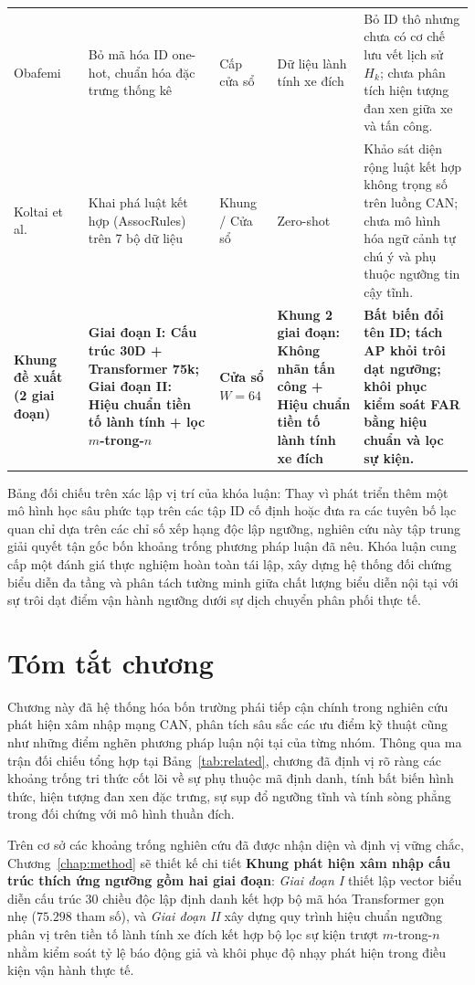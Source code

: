 \documentclass[12pt, a4paper, reqno, oneside]{book}
\begin{document}
\begin{longtable}{P{2.5cm}P{2.9cm}P{1.8cm}P{2.2cm}P{5.1cm}}
Obafemi~\cite{obafemi2026travel} & Bỏ mã hóa ID one-hot, chuẩn hóa đặc trưng thống kê & Cấp cửa sổ & Dữ liệu lành tính xe đích & Bỏ ID thô nhưng chưa có cơ chế lưu vết lịch sử $H_k$; chưa phân tích hiện tượng đan xen giữa xe và tấn công.\\
Koltai et al.~\cite{koltai2026trust} & Khai phá luật kết hợp (AssocRules) trên 7 bộ dữ liệu & Khung / Cửa sổ & Zero-shot & Khảo sát diện rộng luật kết hợp không trọng số trên luồng CAN; chưa mô hình hóa ngữ cảnh tự chú ý và phụ thuộc ngưỡng tin cậy tĩnh.\\
\textbf{Khung đề xuất (2 giai đoạn)} & \textbf{Giai đoạn I: Cấu trúc 30D + Transformer 75k; Giai đoạn II: Hiệu chuẩn tiền tố lành tính + lọc $m$-trong-$n$} & \textbf{Cửa sổ $W=64$} & \textbf{Khung 2 giai đoạn: Không nhãn tấn công + Hiệu chuẩn tiền tố lành tính xe đích} & \textbf{Bất biến đổi tên ID; tách AP khỏi trôi dạt ngưỡng; khôi phục kiểm soát FAR bằng hiệu chuẩn và lọc sự kiện.}\\\bottomrule
\end{longtable}

Bảng đối chiếu trên xác lập vị trí của khóa luận: Thay vì phát triển thêm một mô hình học sâu phức tạp trên các tập ID cố định hoặc đưa ra các tuyên bố lạc quan chỉ dựa trên các chỉ số xếp hạng độc lập ngưỡng, nghiên cứu này tập trung giải quyết tận gốc bốn khoảng trống phương pháp luận đã nêu. Khóa luận cung cấp một đánh giá thực nghiệm hoàn toàn tái lập, xây dựng hệ thống đối chứng biểu diễn đa tầng và phân tách tường minh giữa chất lượng biểu diễn nội tại với sự trôi dạt điểm vận hành ngưỡng dưới sự dịch chuyển phân phối thực tế.

\section{Tóm tắt chương}
Chương này đã hệ thống hóa bốn trường phái tiếp cận chính trong nghiên cứu phát hiện xâm nhập mạng CAN, phân tích sâu sắc các ưu điểm kỹ thuật cũng như những điểm nghẽn phương pháp luận nội tại của từng nhóm. Thông qua ma trận đối chiếu tổng hợp tại Bảng~\ref{tab:related}, chương đã định vị rõ ràng các khoảng trống tri thức cốt lõi về sự phụ thuộc mã định danh, tính bất biến hình thức, hiện tượng đan xen đặc trưng, sự sụp đổ ngưỡng tĩnh và tính sòng phẳng trong đối chứng với mô hình thuần đích. 

Trên cơ sở các khoảng trống nghiên cứu đã được nhận diện và định vị vững chắc, Chương~\ref{chap:method} sẽ thiết kế chi tiết \textbf{Khung phát hiện xâm nhập cấu trúc thích ứng ngưỡng gồm hai giai đoạn}: \textit{Giai đoạn I} thiết lập vector biểu diễn cấu trúc 30 chiều độc lập định danh kết hợp bộ mã hóa Transformer gọn nhẹ ($75.298$ tham số), và \textit{Giai đoạn II} xây dựng quy trình hiệu chuẩn ngưỡng phân vị trên tiền tố lành tính xe đích kết hợp bộ lọc sự kiện trượt $m$-trong-$n$ nhằm kiểm soát tỷ lệ báo động giả và khôi phục độ nhạy phát hiện trong điều kiện vận hành thực tế.
\end{document}

